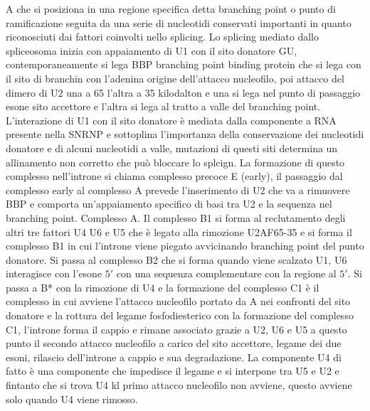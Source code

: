 A che si posiziona in una regione specifica detta branching point o punto di ramificazione seguita da una serie di nucleotidi conservati importanti in quanto riconosciuti dai fattori
coinvolti nello splicing. Lo splicing mediato dallo spliceosoma inizia con appaiamento di U1 con il sito donatore GU, contemporaneamente si lega BBP branching point binding protein che
si lega con il sito di branchin con l'adenina origine dell'attacco nucleofilo, poi attacco del dimero di U2 una a 65  l'altra a 35 kilodalton e una si lega nel punto di passaggio esone
sito accettore e l'altra si lega al tratto a valle del branching point. L'interazione di U1 con il sito donatore \`e mediata dalla componente a RNA presente nella SNRNP e sottoplina 
l'importanza della conservazione dei nucleotidi donatore e di alcuni nucleotidi a valle, mutazioni di questi siti determina un allinamento non corretto che pu\`o bloccare lo splcign. 
La formazione di questo complesso nell'introne si chiama complesso precoce E (early), il passaggio dal complesso early al complesso A prevede l'inserimento di U2 che va a rimuovere
BBP e comporta un'appaiamento specifico di basi tra U2 e la sequenza nel branching point. Complesso A. Il complesso B1 si forma al reclutamento degli altri tre fattori U4 U6 e U5 che 
\`e legato alla rimozione U2AF65-35 e si forma il complesso B1 in cui l'introne viene piegato avvicinando branching point del punto donatore. Si passa al complesso B2 che si forma
quando viene scalzato U1, U6 interagisce con l'esone $5'$ con una sequenza complementare con la regione al $5'$. Si passa a B* con la rimozione di U4 e la formazione del complesso C1 
\`e il complesso in cui avviene l'attacco nucleofilo portato da A nei confronti del sito donatore e la rottura del legame fosfodiesterico con la formazione del complesso C1, l'introne
forma il cappio e rimane associato grazie a U2, U6 e U5 a questo punto il secondo attacco nucleofilo a carico del sito accettore, legame dei due esoni, rilascio dell'introne a cappio e 
sua degradazione. La componente U4 di fatto \`e una componente che impedisce il legame e si interpone tra U5 e U2 e fintanto che si trova U4 kl primo attacco nucleofilo non avviene, 
questo avviene solo quando U4 viene rimosso. 
